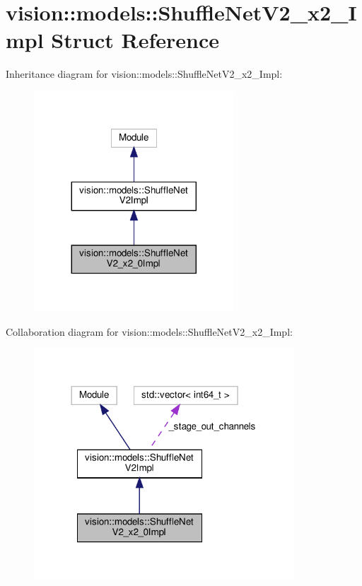 \hypertarget{structvision_1_1models_1_1ShuffleNetV2__x2__0Impl}{}\section{vision\+:\+:models\+:\+:Shuffle\+Net\+V2\+\_\+x2\+\_\+Impl Struct Reference}
\label{structvision_1_1models_1_1ShuffleNetV2__x2__0Impl}


Inheritance diagram for vision\+:\+:models\+:\+:Shuffle\+Net\+V2\+\_\+x2\+\_\+Impl\+:
\nopagebreak
\begin{figure}[H]
\begin{center}
\leavevmode
\includegraphics[width=212pt]{structvision_1_1models_1_1ShuffleNetV2__x2__0Impl__inherit__graph}
\end{center}
\end{figure}


Collaboration diagram for vision\+:\+:models\+:\+:Shuffle\+Net\+V2\+\_\+x2\+\_\+Impl\+:
\nopagebreak
\begin{figure}[H]
\begin{center}
\leavevmode
\includegraphics[width=276pt]{structvision_1_1models_1_1ShuffleNetV2__x2__0Impl__coll__graph}
\end{center}
\end{figure}
